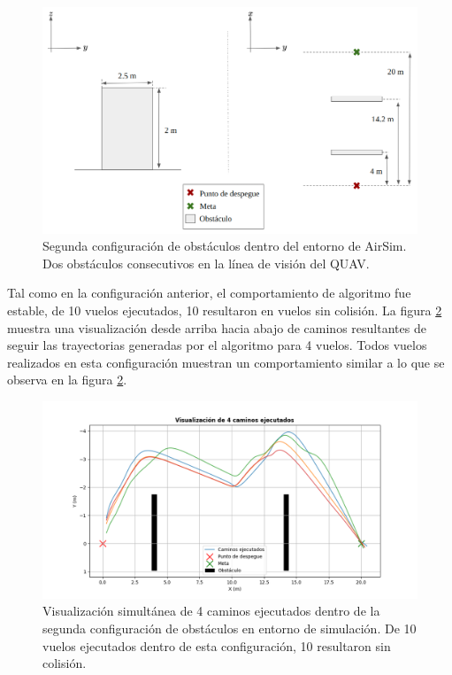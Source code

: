 \begin{figure}[H]
    \centering
    \includegraphics[scale=0.35]{partes/img/config-2-double.png}
    \caption[Segunda configuración de obstáculos dentro del entorno de AirSim.]{Segunda configuración de obstáculos dentro del entorno de AirSim. Dos obstáculos consecutivos en la línea de visión del QUAV.}
    \label{fig:config-2-double}
\end{figure}

Tal como en la configuración anterior, el comportamiento de algoritmo fue estable, de 10 vuelos ejecutados, 10 resultaron en vuelos sin colisión. La figura \ref{fig:double-graph-4} muestra una visualización desde arriba hacia abajo de caminos resultantes de seguir las trayectorias generadas por el algoritmo para 4 vuelos. Todos vuelos realizados en esta configuración muestran un comportamiento similar a lo que se observa en la figura \ref{fig:double-graph-4}.

\begin{figure}[H]
    \centering
    \includegraphics[scale=0.5]{partes/img/sim-double-panel-graph-4.png}
    \caption[Visualización simultánea de 4 caminos ejecutados dentro de la segunda configuración de obstáculos en entorno de simulación.]{Visualización simultánea de 4 caminos ejecutados dentro de la segunda configuración de obstáculos en entorno de simulación. De 10 vuelos ejecutados dentro de esta configuración, 10 resultaron sin colisión.}
    \label{fig:double-graph-4}
\end{figure}

